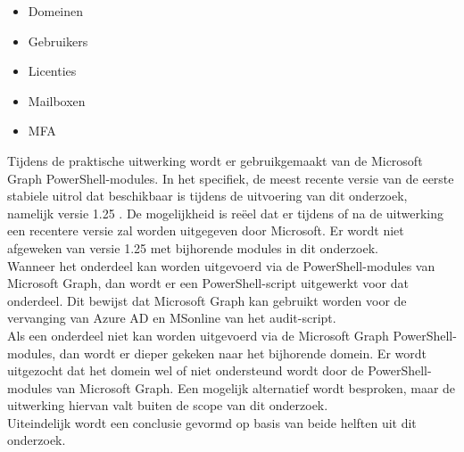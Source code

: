 \begin{itemize}
    \item Domeinen
    \item Gebruikers
    \item Licenties
    \item Mailboxen
    \item \ac{MFA}
\end{itemize}

Tijdens de praktische uitwerking wordt er gebruikgemaakt van de Microsoft Graph PowerShell-modules. In het specifiek, de meest recente versie van de eerste stabiele uitrol dat beschikbaar is tijdens de uitvoering van dit onderzoek, namelijk versie 1.25 \autocite{Microsoft2023k}. De mogelijkheid is reëel dat er tijdens of na de uitwerking een recentere versie zal worden uitgegeven door Microsoft. Er wordt niet afgeweken van versie 1.25 met bijhorende modules in dit onderzoek. \\  

Wanneer het onderdeel kan worden uitgevoerd via de PowerShell-modules van Microsoft Graph, dan wordt er een PowerShell-script uitgewerkt voor dat onderdeel. Dit bewijst dat Microsoft Graph kan gebruikt worden voor de vervanging van Azure \ac{AD} en MSonline van het audit-script. \\

Als een onderdeel niet kan worden uitgevoerd via de Microsoft Graph PowerShell-modules, dan wordt er dieper gekeken naar het bijhorende domein. Er wordt uitgezocht dat het domein wel of niet ondersteund wordt door de PowerShell-modules van Microsoft Graph. Een mogelijk alternatief wordt besproken, maar de uitwerking hiervan valt buiten de scope van dit onderzoek. \\

Uiteindelijk wordt een conclusie gevormd op basis van beide helften uit dit onderzoek. 

